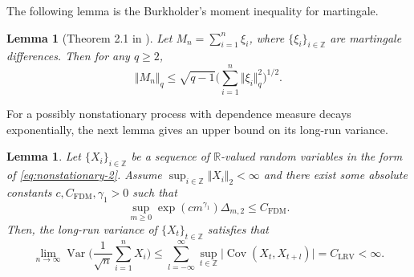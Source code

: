 \documentclass[11pt]{article}
\DeclareMathOperator*{\cov}{Cov}
\DeclareMathOperator*{\var}{Var}
\theoremstyle{plain}
\newtheorem{lemma}[theorem]{Lemma}
\theoremstyle{definition}
\begin{document}
The following lemma is the Burkholder's moment inequality for martingale.
\begin{lemma}[Theorem 2.1 in \cite{rio2009moment}]\label{lemma:burkholder}
Let $M_n = \sum_{i = 1}^n\xi_i$, where $\{\xi_i\}_{i \in \mathbb{Z}}$ are martingale differences. Then for any $q \geq 2$,
\begin{equation*}
    \Vert M_n \Vert_q \leq \sqrt{q-1}\Big(\sum_{i = 1}^{n}\Vert \xi_i \Vert_q^2 \Big)^{1/2}.
\end{equation*}
\end{lemma}

For a possibly nonstationary process with dependence measure decays exponentially, the next lemma gives an upper bound on its long-run variance.
\begin{lemma}\label{lemma:lrv_univar}
    Let $\{X_i\}_{i \in \mathbb{Z}}$ be a sequence of $\mathbb{R}$-valued random variables in the form of \eqref{eq:nonstationary-2}. Assume $\sup_{i \in \mathbb{Z}}\Vert X_i \Vert_2 < \infty$ and there exist some absolute constants $c, C_{\mathrm{FDM}}, \gamma_1 > 0$ such that
    \begin{equation*}
        \sup_{m \geq 0}\exp(cm^{\gamma_1})\Delta_{m,2} \leq C_{\mathrm{FDM}}.
    \end{equation*}
    Then, the long-run variance of $\{X_t\}_{t \in \mathbb{Z}}$ satisfies that
    \begin{equation}\label{eq:def_LRV_UB}
        \lim_{n \to \infty}\var\Big(\frac{1}{\sqrt{n}}\sum_{i = 1}^n X_i\Big) \leq \sum_{l = -\infty}^{\infty}\sup_{t \in \mathbb{Z}}\big|\cov(X_{t}, X_{t+l})\big| = C_{\mathrm{LRV}} < \infty.
    \end{equation}
\end{lemma}
\end{document}
